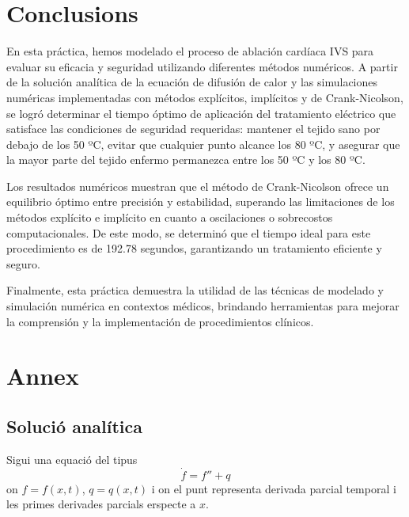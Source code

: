 \documentclass{article}
\begin{document}
\section{Conclusions}
En esta práctica, hemos modelado el proceso de ablación cardíaca IVS para evaluar su eficacia y %
seguridad utilizando diferentes métodos numéricos. A partir de la solución analítica de la ecuación de difusión de calor y las simulaciones numéricas implementadas con métodos explícitos, implícitos y de Crank-Nicolson, se logró determinar el tiempo óptimo de aplicación del tratamiento eléctrico que satisface las condiciones de seguridad requeridas: mantener el tejido sano por debajo de los 50 ºC, evitar que cualquier punto alcance los 80 ºC, y asegurar que la mayor parte del tejido enfermo permanezca entre los 50 ºC y los 80 ºC.

Los resultados numéricos muestran que el método de Crank-Nicolson ofrece un equilibrio óptimo entre precisión y estabilidad, superando las limitaciones de los métodos explícito e implícito en cuanto a oscilaciones o sobrecostos computacionales. De este modo, se determinó que el tiempo ideal para este procedimiento es de 192.78 segundos, garantizando un tratamiento eficiente y seguro.

Finalmente, esta práctica demuestra la utilidad de las técnicas de modelado y simulación numérica en contextos médicos, brindando herramientas para mejorar la comprensión y la implementación de procedimientos clínicos.

\section{Annex}\label{Annex I}
\subsection{Solució analítica}
Sigui una equació del tipus
\begin{equation*}
    \dot{f} = f'' + q
\end{equation*}
on $f = f(x,t)$, $q =q(x,t)$ i on el punt representa derivada parcial temporal i les primes derivades parcials erspecte a $x$.
\end{document}
